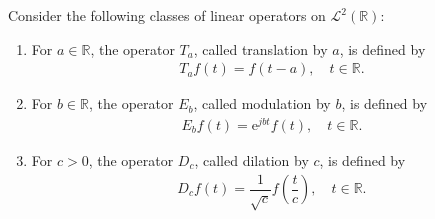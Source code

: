 \begin{definition} \label{def:TMD}
Consider the following classes of linear operators on $\mathcal{L}^2(\mathbb{R})$:
\begin{enumerate}
\item For $a \in \mathbb{R}$, the operator $T_a$, called translation by $a$, is defined by
\begin{align*}
T_a f(t) = f(t-a), \quad t \in \mathbb{R}.
\end{align*}

\item For $b \in \mathbb{R}$, the operator $E_b$, called modulation by $b$, is defined by
\begin{align*}
E_b f(t) = \text{e}^{j b t} f(t), \quad t \in \mathbb{R}.
\end{align*}

\item For $c > 0$, the operator $D_c$, called dilation by $c$, is defined by
\begin{align*}
D_c f(t) = \dfrac{1}{\sqrt{c}} f\left( \dfrac{t}{c} \right), \quad t \in \mathbb{R}.
\end{align*}
\end{enumerate}
\end{definition}
